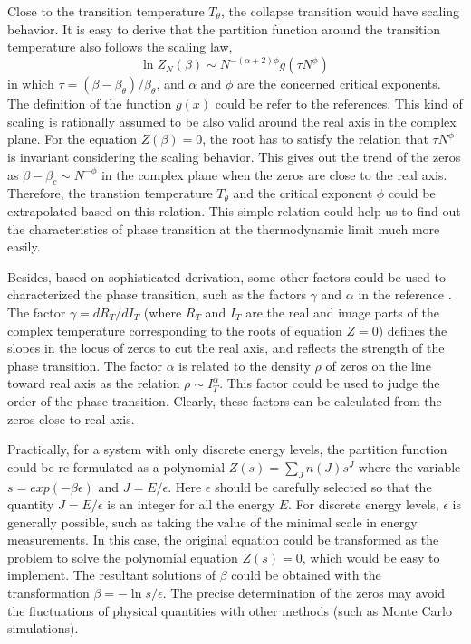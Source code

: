 \documentclass[preprint,preprintnumbers,amsmath,amssymb,showpacs,aps,pre]{revtex4-1}
\begin{document}
Close to the transition temperature $T_{\theta}$, the collapse transition
would have scaling behavior. It is easy to derive that the partition
function around the transition temperature also follows the scaling law,
\begin{equation}
\ln Z_N(\beta) \sim N^{-(\alpha+2)\phi} g(\tau N^{\phi}) \,
\end{equation}
in which $\tau=(\beta-\beta_{\theta})/\beta_{\theta}$, and $\alpha$ and
$\phi$ are the concerned critical exponents. The definition of the function
$g(x)$ could be refer to the references\cite{ChangPRE93}. This kind of
scaling is rationally assumed to be also valid around the real axis in
the complex plane. For the equation $Z(\beta)=0$, the root has to satisfy
the relation that $\tau N^{\phi}$ is invariant considering the scaling
behavior. This gives out the trend of the zeros as 
$\beta-\beta_c \sim N^{-\phi}$ in the complex plane when the zeros are
close to the real axis. Therefore, the
transtion temperature $T_{\theta}$ and the critical exponent $\phi$ could be
extrapolated based on this relation. This simple relation could help us to
find out the characteristics of phase transition at the thermodynamic limit
much more easily.

Besides, based on sophisticated derivation, some other factors could be used
to characterized the phase transition, such as the factors $\gamma$ and
$\alpha$ in the reference \cite{WangJCP03}. The factor $\gamma=d R_T/d I_T$
(where $R_T$ and $I_T$ are the real and image parts of the complex temperature
corresponding to the roots of equation $Z=0$) defines the slopes in the locus
of zeros to cut the real axis, and reflects the strength of the phase
transition. The factor $\alpha$ is related to the density $\rho$ of zeros on
the line toward real axis as the relation $\rho \sim I_T^{\alpha}$. This
factor could be used to judge the order of the phase transition. Clearly,
these factors can be calculated from the zeros close to real axis.

Practically, for a system with only discrete energy levels, the partition
function could be
re-formulated as a polynomial $Z(s)=\sum_J n(J) s^J$ where the variable
$s=exp(-\beta\epsilon)$ and $J=E/\epsilon$. Here $\epsilon$ should be carefully
selected so that the quantity $J=E/\epsilon$ is an integer for all the energy
$E$. For discrete energy levels, $\epsilon$ is generally possible, such as
taking the value of the minimal scale in energy measurements. In this case, the
original equation could be transformed as the problem to solve the polynomial
equation $Z(s)=0$, which would be easy to implement. The resultant solutions
of $\beta$ could be obtained with the transformation $\beta=-\ln s/\epsilon$.
The precise determination of the zeros may avoid the fluctuations of physical
quantities with other methods (such as Monte Carlo simulations).
\end{document}
